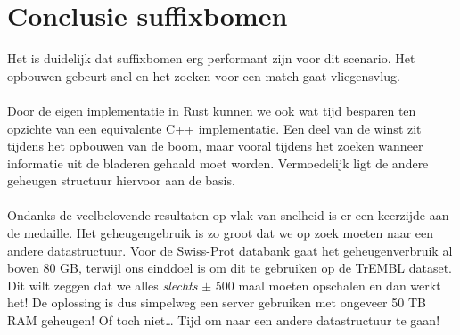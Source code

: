 \section{Conclusie suffixbomen}\label{sec:conclusie-suffix-bomen}
Het is duidelijk dat suffixbomen erg performant zijn voor dit scenario.
Het opbouwen gebeurt snel en het zoeken voor een match gaat vliegensvlug.
\\ \\
Door de eigen implementatie in Rust kunnen we ook wat tijd besparen ten opzichte van een equivalente C++ implementatie.
Een deel van de winst zit tijdens het opbouwen van de boom, maar vooral tijdens het zoeken wanneer informatie uit de bladeren gehaald moet worden.
Vermoedelijk ligt de andere geheugen structuur hiervoor aan de basis.
\\ \\
Ondanks de veelbelovende resultaten op vlak van snelheid is er een keerzijde aan de medaille.
Het geheugengebruik is zo groot dat we op zoek moeten naar een andere datastructuur.
Voor de Swiss-Prot databank gaat het geheugenverbruik al boven 80 GB, terwijl ons einddoel is om dit te gebruiken op de TrEMBL dataset.
Dit wilt zeggen dat we alles \textit{slechts} $\pm$ 500 maal moeten opschalen en dan werkt het!
De oplossing is dus simpelweg een server gebruiken met ongeveer 50 TB RAM geheugen!
Of toch niet\ldots
Tijd om naar een andere datastructuur te gaan!
